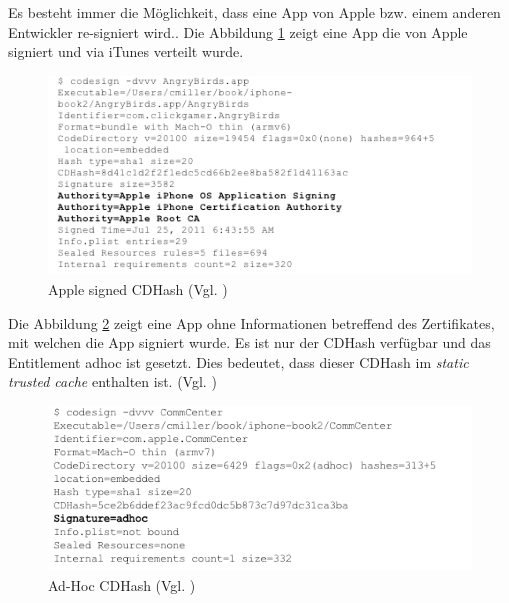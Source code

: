 Es besteht immer die Möglichkeit, dass eine App von Apple bzw. einem anderen Entwickler re-signiert wird.\cite{Sign[1], Sign[2], Sign[3], Sign[4], Sign[5]}. Die Abbildung \ref{fig:Apple signed CDHash} zeigt eine App die von Apple signiert und via iTunes verteilt wurde.

\begin{figure}[!ht]
        \centering
        \includegraphics[scale=1.0]{AppleZert_CDHash.png}
        \caption{Apple signed CDHash (Vgl. \cite{Hacking[1]})}
        \label{fig:Apple signed CDHash}
\end{figure}

Die Abbildung \ref{fig:Ad-Hoc CDHash} zeigt eine App ohne Informationen betreffend des Zertifikates, mit welchen die App signiert wurde. Es ist nur der CDHash verfügbar und das Entitlement adhoc ist gesetzt. Dies bedeutet, dass dieser CDHash im \textit{\glqq static trusted cache\grqq{}} enthalten ist. (Vgl. \cite{Sign[1], Sign[2], Sign[3], Sign[4], Sign[5]})

\begin{figure}[!ht]
        \centering
        \includegraphics[scale=0.9]{ADhoc_CDHash.png}
        \caption{Ad-Hoc CDHash (Vgl. \cite{Hacking[1]})}
        \label{fig:Ad-Hoc CDHash}
\end{figure}

